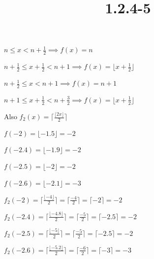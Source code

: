 \documentclass{article}
\title{1.2.4-5}
\begin{document}
\maketitle

\( n \leq x < n + \frac{1}{2} \implies f(x) = n \)

\( n + \frac{1}{2} \leq x + \frac{1}{2} < n + 1 \implies f(x) = \lfloor x + \frac{1}{2} \rfloor \)

\( n + \frac{1}{2} \leq x < n + 1 \implies f(x) = n + 1 \)

\( n + 1 \leq x + \frac{1}{2} < n + \frac{3}{2} \implies f(x) = \lfloor x + \frac{1}{2} \rfloor \)

Also \( f_2(x)=\lceil\frac{\lfloor{2x}\rfloor}{2}\rceil \)

\( f(-2) = \lfloor -1.5 \rfloor = -2 \)

\( f(-2.4) = \lfloor -1.9 \rfloor = -2 \)

\( f(-2.5) = \lfloor -2 \rfloor = -2 \)

\( f(-2.6) = \lfloor -2.1 \rfloor = -3 \)

\( f_2(-2) = \lceil\frac{\lfloor{-4}\rfloor}{2}\rceil = \lceil\frac{-4}{2}\rceil = \lceil -2 \rceil = -2 \)

\( f_2(-2.4) = \lceil\frac{\lfloor{-4.8}\rfloor}{2}\rceil = \lceil\frac{-5}{2}\rceil = \lceil -2.5 \rceil = -2 \)

\( f_2(-2.5) = \lceil\frac{\lfloor{-5}\rfloor}{2}\rceil = \lceil\frac{-5}{2}\rceil = \lceil -2.5 \rceil = -2 \)

\( f_2(-2.6) = \lceil\frac{\lfloor{-5.2}\rfloor}{2}\rceil = \lceil\frac{-6}{2}\rceil = \lceil -3 \rceil = -3 \)
\end{document}
